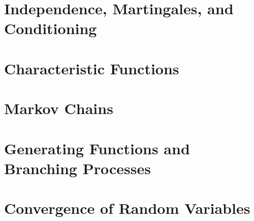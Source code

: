 \documentclass[12pt]{article}
\theoremstyle{definition}
\theoremstyle{remark}
\numberwithin{equation}{section}
\begin{document}
\section{Independence, Martingales, and Conditioning}%
  \label{sec:independence_martingales_and_conditioning}
 
  \section{Characteristic Functions}%
  \label{sec:characteristic_functions}
  
  \section{Markov Chains}%
  \label{sec:markov_chains}
  
  \section{Generating Functions and Branching Processes}%
  \label{sec:generating_functions_and_branching_processes}
  
  \section{Convergence of Random Variables}%
  \label{sec:convergence_of_random_variables} 
\end{document}
